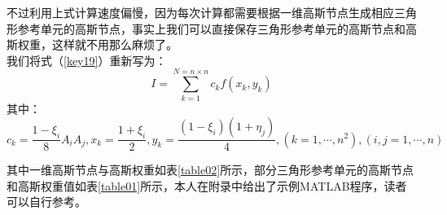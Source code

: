 \documentclass{article}                          %
\numberwithin{equation}{subsection}              %
\begin{document}
不过利用上式计算速度偏慢，因为每次计算都需要根据一维高斯节点生成相应三角形参考单元的高斯节点，事实上我们可以直接保存三角形参考单元的高斯节点和高斯权重，这样就不用那么麻烦了。\\
我们将式（\ref{key19}）重新写为：
	\begin{equation}\label{key110}
	I=\sum_{k=1}^{N=n\times n}c_k f(x_k,y_k)
	\end{equation}
其中：
	\begin{equation}\label{key}
	c_k=\frac{1-\xi_i}{8} A_i A_j, x_k=\frac{1+\xi_i}{2},y_k=\frac{(1-\xi_i)(1+\eta_j)}{4},(k=1,\cdots,n^2),(i,j=1,\cdots,n)
	\end{equation}
	
	

其中一维高斯节点与高斯权重如表\ref{table02}所示，部分三角形参考单元的高斯节点和高斯权重值如表\ref{table01}所示，本人在附录中给出了示例MATLAB程序，读者可以自行参考。
\end{document}
